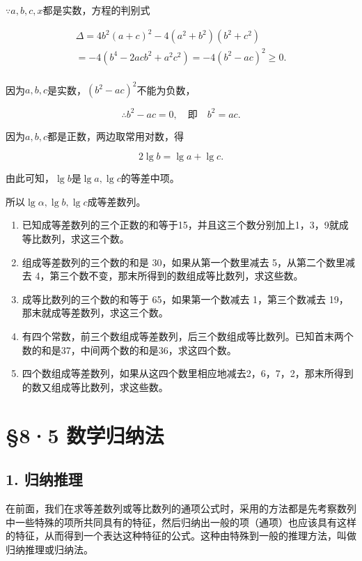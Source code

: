  \(\because a, b, c, x\)都是实数，方程的判别式

\[
\begin{array}{l} \Delta = 4 b^{2} (a + c)^{2} - 4 (a^{2} + b^{2}) (b^{2} + c^{2}) \\ = - 4 \left(b^{4} - 2 a c b^{2} + a^{2} c^{2}\right) = - 4 \left(b^{2} - a c\right)^{2} \geqslant 0. \\ \end{array}
\]

因为\(a, b, c\)是实数，\((b^2 - ac)^2\)不能为负数，

\[
\therefore b^{2} - a c = 0, \quad \text{即} \quad b^{2} = a c.
\]

因为\(a, b, c\)都是正数，两边取常用对数，得

\[
2 \lg b = \lg a + \lg c.
\]

由此可知，\(\lg b\)是\(\lg a, \lg c\)的等差中项。

所以\(\lg \alpha, \lg b, \lg c\)成等差数列。

\begin{enumerate}
\item
  已知成等差数列的三个正数的和等于15，并且这三个数分别加上1，3，9就成等比数列，求这三个数。
\item
  组成等差数列的三个数的和是 30，如果从第一个数里减去
  5，从第二个数里减去
  4，第三个数不变，那末所得到的数组成等比数列，求这些数。
\item
  成等比数列的三个数的和等于 65，如果第一个数减去 1，第三个数减去
  19，那末就成等差数列，求这三个数。
\item
  有四个常数，前三个数组成等差数列，后三个数组成等比数列。已知首末两个数的和是37，中间两个数的和是36，求这四个数。
\item
  四个数组成等差数列，如果从这四个数里相应地减去2，6，7，2，那末所得到的数又组成等比数列，求这些数。
\end{enumerate}

\section{§8·5 数学归纳法}

\subsection{1. 归纳推理}

在前面，我们在求等差数列或等比数列的通项公式时，采用的方法都是先考察数列中一些特殊的项所共同具有的特征，然后归纳出一般的项（通项）也应该具有这样的特征，从而得到一个表达这种特征的公式。这种由特殊到一般的推理方法，叫做归纳推理或归纳法。

